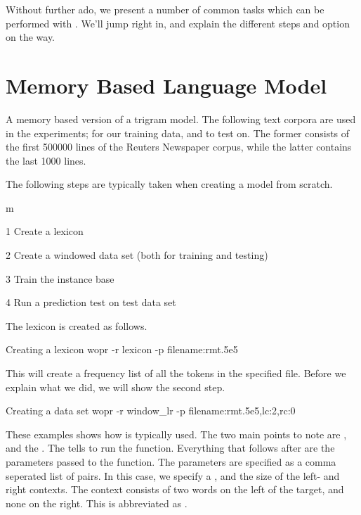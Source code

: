 \documentclass[a4paper,10pt,twoside]{report}
\begin{document}
Without further ado, we present a number of common tasks which can be
performed with \wopr{}. We'll jump right in, and explain the different
steps and option on the way.

\section{Memory Based Language Model}

A memory based version of a trigram model. The following text corpora
are used in the experiments;  for our training data, and
 to test on. The former consists of the first
\num{500000} lines of the Reuters Newspaper corpus, while the latter
contains the last \num{1000} lines.

The following steps are typically taken when creating a model from
scratch.

\begin{varlist}{m}
\item[1] Create a lexicon
\item[2] Create a windowed data set (both for training and testing)
\item[3] Train the instance base
\item[4] Run a prediction test on test data set
\end{varlist}

The lexicon is created as follows.

\begin{bash}{Creating a lexicon}
wopr -r lexicon -p filename:rmt.5e5
\end{bash}

This will create a frequency list of all the tokens in the specified
file. Before we explain what we did, we will show the second step.

\begin{bash}{Creating a data set}
wopr -r window_lr -p filename:rmt.5e5,lc:2,rc:0
\end{bash}

These examples shows how \wopr{} is typically used. The two main
points to note are , and the . The
 tells \wopr{} to run the 
function. Everything that follows after  are the parameters
passed to the function. The parameters are specified as a comma
seperated list of  pairs. In this case, we specify
a ,  and the size of the left- and right
contexts. The context consists of two words on the left of the target,
and none on the right. This is abbreviated as .
\end{document}
